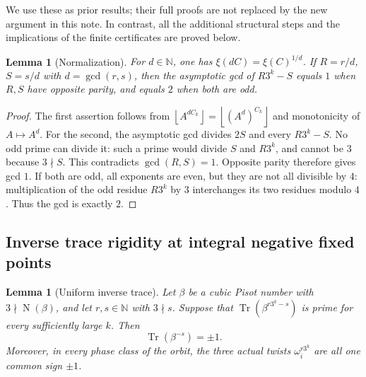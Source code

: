 \documentclass[11pt,a4paper]{article}
\newtheorem{lemma}[theorem]{Lemma}\newtheorem{proposition}[theorem]{Proposition}
\theoremstyle{definition}\newtheorem{definition}[theorem]{Definition}
\theoremstyle{remark}\newtheorem{remark}[theorem]{Remark}
\newcommand{\N}{\mathbb N}\newcommand{\Z}{\mathbb Z}\newcommand{\Q}{\mathbb Q}
\newcommand{\floor}[1]{\left\lfloor#1\right\rfloor}
\DeclareMathOperator{\Tr}{Tr}\DeclareMathOperator{\tr}{tr}\DeclareMathOperator{\Nm}{N}
\begin{document}
We use these as prior results; their full proofs are not replaced by the
new argument in this note. In contrast, all the additional structural
steps and the implications of the finite certificates are proved below.

\begin{lemma}[Normalization]\label{N01:lem:normalization}
For $d\in\N$, one has $\xi(dC)=\xi(C)^{1/d}$. If
$R=r/d$, $S=s/d$ with $d=\gcd(r,s)$, then the asymptotic gcd of
$R3^k-S$ equals $1$ when $R,S$ have opposite parity, and equals $2$
when both are odd.
\end{lemma}
\begin{proof}
The first assertion follows from
$\floor{A^{dC_k}}=\floor{(A^d)^{C_k}}$ and monotonicity of $A\mapsto A^d$.
For the second, the asymptotic gcd divides $2S$ and every $R3^k-S$.
No odd prime can divide it: such a prime would divide $S$ and $R3^k$,
and cannot be $3$ because $3\nmid S$. This contradicts $\gcd(R,S)=1$.
Opposite parity therefore gives gcd $1$. If both are odd, all exponents
are even, but they are not all divisible by $4$: multiplication of the
odd residue $R3^k$ by $3$ interchanges its two residues modulo $4$.
Thus the gcd is exactly $2$.
\end{proof}

\subsection{Inverse trace rigidity at integral negative fixed points}

\begin{lemma}[Uniform inverse trace]\label{N01:lem:inverse}
Let $\beta$ be a cubic Pisot number with $3\nmid\Nm(\beta)$, and let
$r,s\in\N$ with $3\nmid s$. Suppose that
$\Tr(\beta^{r3^k-s})$ is prime for every sufficiently large $k$.
Then
\[
 \Tr(\beta^{-s})=\pm1.
\]
Moreover, in every phase class of the orbit, the three actual twists
$\omega_i^{r3^k}$ are all one common sign $\pm1$.
\end{lemma}
\end{document}
